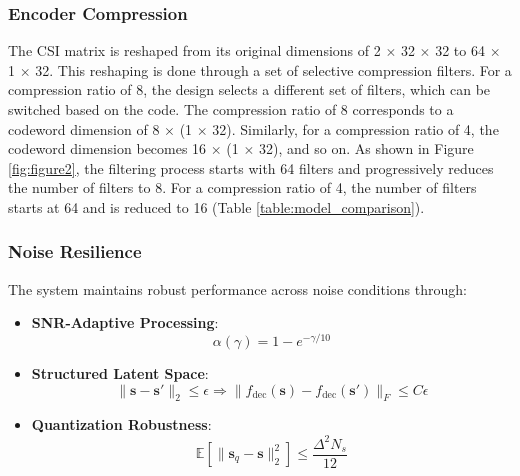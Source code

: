 \documentclass[lettersize,journal]{IEEEtran}
\begin{document}
\subsubsection{Encoder Compression}
The CSI matrix is reshaped from its original dimensions of 2 \begin{math} \times \end{math} 32 \begin{math} \times \end{math} 32 to 64 \begin{math} \times \end{math} 1 \begin{math} \times \end{math} 32. This reshaping is done through a set of selective compression filters. For a compression ratio of 8, the design selects a different set of filters, which can be switched based on the code. The compression ratio of 8 corresponds to a codeword dimension of 8 \begin{math} \times \end{math} (1 \begin{math} \times \end{math} 32). Similarly, for a compression ratio of 4, the codeword dimension becomes 16 \begin{math} \times \end{math} (1 \begin{math} \times \end{math} 32), and so on.
As shown in Figure \ref{fig:figure2}, the filtering process starts with 64 filters and progressively reduces the number of filters to 8. For a compression ratio of 4, the number of filters starts at 64 and is reduced to 16 (Table \ref{table:model_comparison}).

\subsubsection{Noise Resilience} 
\label{subsubsec:noise_resilience}

The system maintains robust performance across noise conditions through:

\begin{itemize}
    \item \textbf{SNR-Adaptive Processing}:
    \begin{equation}
        \alpha(\gamma) = 1 - e^{-\gamma/10}
    \end{equation}

    \item \textbf{Structured Latent Space}:
    \begin{equation}
        \|\mathbf{s} - \mathbf{s}'\|_2 \leq \epsilon \Rightarrow \|f_{\text{dec}}(\mathbf{s}) - f_{\text{dec}}(\mathbf{s}')\|_F \leq C\epsilon
    \end{equation}

    \item \textbf{Quantization Robustness}:
    \begin{equation}
        \mathbb{E}[\|\mathbf{s}_q - \mathbf{s}\|_2^2] \leq \frac{\Delta^2 N_s}{12}
    \end{equation}
\end{itemize}
\end{document}
